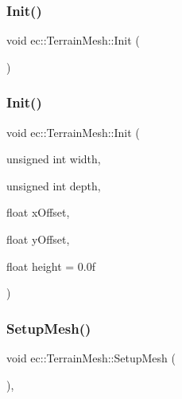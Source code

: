 \subsubsection{\texorpdfstring{Init()}{Init()}\hspace{0.1cm}{\footnotesize\ttfamily [1/2]}}
{\footnotesize\ttfamily void ec\+::\+Terrain\+Mesh\+::\+Init (\begin{DoxyParamCaption}{ }\end{DoxyParamCaption})}

\mbox{\label{classec_1_1_terrain_mesh_a48250b32fe2a39c9bf7cf17e81adbca6}} 
\subsubsection{\texorpdfstring{Init()}{Init()}\hspace{0.1cm}{\footnotesize\ttfamily [2/2]}}
{\footnotesize\ttfamily void ec\+::\+Terrain\+Mesh\+::\+Init (\begin{DoxyParamCaption}\item[{unsigned int}]{width,  }\item[{unsigned int}]{depth,  }\item[{float}]{x\+Offset,  }\item[{float}]{y\+Offset,  }\item[{float}]{height = {\ttfamily 0.0f} }\end{DoxyParamCaption})}

\mbox{\label{classec_1_1_terrain_mesh_a917158d33fbef07ed43ec310f4dbab45}} 
\subsubsection{\texorpdfstring{Setup\+Mesh()}{SetupMesh()}}
{\footnotesize\ttfamily void ec\+::\+Terrain\+Mesh\+::\+Setup\+Mesh (\begin{DoxyParamCaption}{ }\end{DoxyParamCaption})\hspace{0.3cm}{\ttfamily [protected]}, {\ttfamily [virtual]}}



